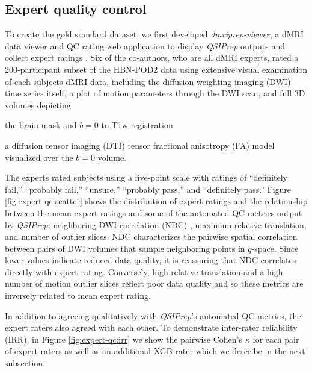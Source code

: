 \documentclass[fleqn,10pt]{wlscirep}
\begin{document}
\subsection*{Expert quality control}

To create the gold standard dataset, we first developed \emph{dmriprep-viewer},
a dMRI data viewer and QC rating web application to display \emph{QSIPrep}
outputs and collect expert ratings \cite{richie-halford2021-viewer}. Six of the
co-authors, who are all dMRI experts, rated a 200-participant subset of the
HBN-POD2 data using extensive visual examination of each subjects dMRI data,
including the diffusion weighting imaging (DWI) time series itself, a plot of
motion parameters through the DWI scan, and full 3D volumes depicting
\begin{enumerate*}[%
    label=(\roman*),%
    before={{ }},%
    itemjoin={{, }},%
    itemjoin*={{ and }}]
    \item the brain mask and $b=0$ to T1w registration
    \item a diffusion tensor imaging (DTI) tensor fractional anisotropy (FA)
    model visualized over the $b=0$ volume.
\end{enumerate*}
The experts rated subjects using a five-point scale with ratings of ``definitely
fail,'' ``probably fail,'' ``unsure,'' ``probably pass,'' and ``definitely
pass.'' Figure \ref{fig:expert-qc:scatter} shows the distribution of expert
ratings and the relationship between the mean expert ratings and some of the
automated QC metrics output by \emph{QSIPrep}: neighboring DWI correlation (NDC)
\cite{yeh2019-kb}, maximum relative translation, and number of outlier slices.
NDC characterizes the pairwise spatial correlation between pairs of DWI volumes
that sample neighboring points in $q$-space. Since lower values indicate reduced
data quality, it is reassuring that NDC correlates directly with expert rating.
Conversely, high relative translation and a high number of motion outlier slices
reflect poor data quality and so these metrics are inversely related to mean
expert rating.

In addition to agreeing qualitatively with \emph{QSIPrep}'s automated QC
metrics, the expert raters also agreed with each other. To demonstrate
inter-rater reliability (IRR), in Figure \ref{fig:expert-qc:irr} we show the
pairwise Cohen's $\kappa$ \cite{di_eugenio2004-bb} for each pair of expert
raters as well as an additional XGB rater which we describe in the next
subsection.
\end{document}
